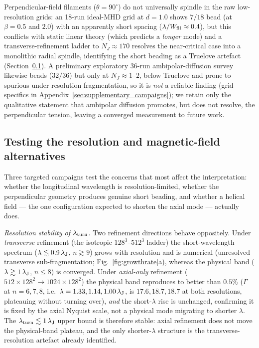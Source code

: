 \documentclass[usenatbib,twoside,twocolumn]{mnras}
\begin{document}
Perpendicular-field filaments ($\theta=90^\circ$) do not universally spindle in the raw low-resolution grids: an 18-run ideal-MHD grid at $d=1.0$ shows $7/18$ bead (at $\beta=0.5$ and $2.0$) with an apparently short spacing ($\lambda/W_{\rm fil}\approx0.4$), but this conflicts with static linear theory (which predicts a \emph{longer} mode) and a transverse-refinement ladder to $N_J\approx170$ resolves the near-critical case into a monolithic radial spindle, identifying the short beading as a Truelove artefact (Section~\ref{sec:optional_tests}). A preliminary exploratory 36-run ambipolar-diffusion survey likewise beads ($32/36$) but only at $N_J\approx1$--$2$, below Truelove and prone to spurious under-resolution fragmentation, so it is \emph{not} a reliable finding (grid specifics in Appendix~\ref{sec:supplementary_campaigns}); we retain only the qualitative statement that ambipolar diffusion promotes, but does not resolve, the perpendicular tension, leaving a converged measurement to future work.

\subsection{Testing the resolution and magnetic-field alternatives}
\label{sec:optional_tests}
Three targeted campaigns test the concerns that most affect the interpretation: whether the longitudinal wavelength is resolution-limited, whether the perpendicular geometry produces genuine short beading, and whether a helical field --- the one configuration expected to shorten the axial mode --- actually does.

\emph{Resolution stability of $\lambda_{\rm turn}$.} Two refinement directions behave oppositely. Under \emph{transverse} refinement (the isotropic $128^3$--$512^3$ ladder) the short-wavelength spectrum ($\lambda\lesssim0.9\,\lambda_{\rm J}$, $n\gtrsim9$) grows with resolution and is numerical (unresolved transverse sub-fragmentation; Fig.~\ref{fig:growthrate}a), whereas the physical band ($\lambda\gtrsim1\,\lambda_{\rm J}$, $n\leq8$) is converged. Under \emph{axial-only} refinement ($512\times128^2\to1024\times128^2$) the physical band reproduces to better than $0.5\%$ ($\Gamma$ at $n=6,7,8$, i.e.\ $\lambda=1.33,1.14,1.00\,\lambda_{\rm J}$, is $17.6,18.7,18.7$ at both resolutions, plateauing without turning over), \emph{and} the short-$\lambda$ rise is unchanged, confirming it is fixed by the axial Nyquist scale, not a physical mode migrating to shorter $\lambda$. The $\lambda_{\rm turn}\lesssim1\,\lambda_{\rm J}$ upper bound is therefore stable: axial refinement does not move the physical-band plateau, and the only shorter-$\lambda$ structure is the transverse-resolution artefact already identified.
\end{document}
